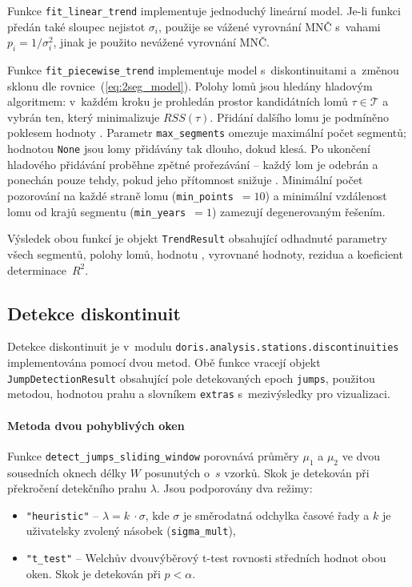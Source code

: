 Funkce \texttt{fit\_linear\_trend} implementuje jednoduchý lineární model. Je-li funkci předán také sloupec nejistot $\sigma_i$, použije se vážené vyrovnání MNČ s~vahami \(p_i = 1/\sigma_i^2\), jinak je použito nevážené vyrovnání MNČ.

Funkce \texttt{fit\_piecewise\_trend} implementuje model s~diskontinuitami a~změnou sklonu dle rovnice~(\ref{eq:2seg_model}).  Polohy lomů jsou hledány hladovým algoritmem: v~každém kroku je prohledán prostor kandidátních lomů $\tau \in \mathcal{T}$ a vybrán ten, který minimalizuje
$RSS(\tau)$.  Přidání dalšího lomu je podmíněno poklesem hodnoty . Parametr \texttt{max\_segments} omezuje maximální počet segmentů; hodnotou \texttt{None} jsou lomy přidávány tak dlouho, dokud  klesá. Po ukončení hladového přidávání proběhne zpětné prořezávání -- každý lom je odebrán a ponechán pouze tehdy, pokud jeho přítomnost snižuje .  Minimální počet pozorování na každé straně lomu (\texttt{min\_points}~$=10$) a minimální vzdálenost lomu od krajů segmentu (\texttt{min\_years}~$=1$) zamezují degenerovaným řešením.

Výsledek obou funkcí je objekt \texttt{TrendResult} obsahující odhadnuté
parametry všech segmentů, polohy lomů, hodnotu , vyrovnané
hodnoty, rezidua a koeficient determinace~$R^2$.

\subsection{Detekce diskontinuit}
Detekce diskontinuit je v~modulu \texttt{doris.analysis.stations.discontinuities} implementována pomocí dvou metod. Obě funkce vracejí objekt \texttt{JumpDetectionResult} obsahující pole detekovaných epoch \texttt{jumps}, použitou metodou, hodnotou prahu a slovníkem \texttt{extras} s~mezivýsledky pro vizualizaci.

\paragraph{Metoda dvou pohyblivých oken}
Funkce \texttt{detect\_jumps\_sliding\_window} porovnává průměry $\mu_1$ a $\mu_2$ ve dvou sousedních oknech délky $W$ posunutých o~$s$ vzorků. Skok je detekován při překročení detekčního prahu $\lambda$. Jsou podporovány dva režimy:

\begin{itemize}
    \item \texttt{"heuristic"} -- 
    $\lambda = k~\cdot \sigma$, kde $\sigma$ je směrodatná odchylka časové řady a $k$ je uživatelsky zvolený násobek (\texttt{sigma\_mult}),
    
    \item \texttt{"t\_test"} -- 
    Welchův dvouvýběrový t-test rovnosti středních hodnot obou oken. Skok je detekován při $p < \alpha$.
\end{itemize}

